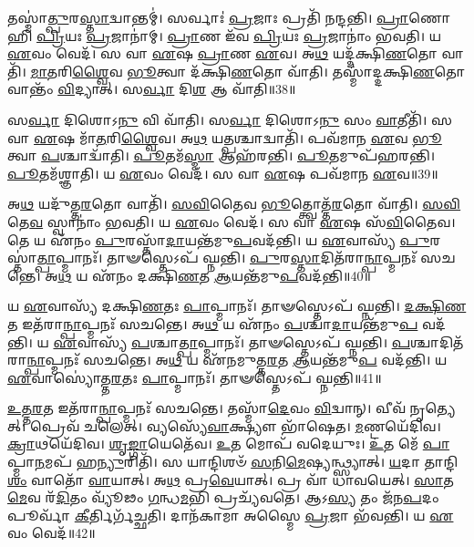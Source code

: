 𑌤𑌸𑍍𑌮𑌾॑\-\ul{𑌤𑍍𑌪𑍁}\-𑌰\-\ul{𑌸𑍍𑌤𑌾}\-𑌦𑍍𑌵𑌾𑌨𑍍𑌤𑌮𑍍॑।
𑌸𑌰𑍍𑌵𑌾𑌃॑ \ul{𑌪𑍍𑌰}\-𑌜𑌾𑌃 𑌪𑍍𑌰𑌤𑌿᳴ 𑌨𑌨𑍍𑌦𑌨𑍍𑌤𑌿।
\-\ul{𑌪𑍍𑌰𑌾}\-𑌣𑍋 𑌹𑌿 \ul{𑌪𑍍𑌰𑌿}\-𑌯𑌃 \ul{𑌪𑍍𑌰}\-𑌜𑌾𑌨𑌾॑𑌮𑍍।
\-\ul{𑌪𑍍𑌰𑌾}\-𑌣 𑌇᳴𑌵 \ul{𑌪𑍍𑌰𑌿}\-𑌯𑌃 \ul{𑌪𑍍𑌰}\-𑌜𑌾𑌨𑌾𑌂॑ 𑌭𑌵𑌤𑌿।
𑌯 \ul{𑌏}\-𑌵𑌂 𑌵𑍇𑌦᳴।
𑌸 𑌵𑌾 \ul{𑌏}\-𑌷 \ul{𑌪𑍍𑌰𑌾}\-𑌣 \ul{𑌏}\-𑌵।
𑌅\-\ul{𑌥} 𑌯𑌦𑍍𑌦᳴𑌕𑍍𑌷𑌿\-\ul{𑌣}\-𑌤𑍋 𑌵𑌾𑌤𑌿᳴।
\-\ul{𑌮𑌾}\-\-\ul{𑌤}\-𑌰𑌿\-\ul{𑌶𑍍𑌵𑍈}\-𑌵 \ul{𑌭𑍂}\-𑌤𑍍𑌵𑌾 𑌦᳴𑌕𑍍𑌷𑌿\-\ul{𑌣}\-𑌤𑍋 𑌵𑌾᳴𑌤𑌿।
𑌤𑌸𑍍𑌮𑌾॑𑌦𑍍𑌦𑌕𑍍𑌷𑌿\-\ul{𑌣}\-𑌤𑍋 𑌵𑌾𑌨𑍍𑌤𑌂᳴ \ul{𑌵𑌿}\-𑌦𑍍𑌯𑌾𑌤𑍍।
𑌸\-\ul{𑌰𑍍𑌵𑌾} 𑌦𑌿\-\ul{𑌶} 𑌆 𑌵𑌾᳴𑌤𑌿॥38॥

𑌸\-\ul{𑌰𑍍𑌵𑌾} 𑌦𑌿𑌶𑍋𑌽\-\ul{𑌨𑍁} 𑌵𑌿 𑌵𑌾᳴𑌤𑌿।
𑌸\-\ul{𑌰𑍍𑌵𑌾} 𑌦𑌿𑌶𑍋𑌽\-\ul{𑌨𑍁} 𑌸𑌂 \ul{𑌵𑌾}\-𑌤𑍀𑌤𑌿᳴।
𑌸 𑌵𑌾 \ul{𑌏}\-𑌷 𑌮𑌾᳴\-\ul{𑌤}\-𑌰𑌿\-\ul{𑌶𑍍𑌵𑍈}\-𑌵।
𑌅\-\ul{𑌥} 𑌯\-\ul{𑌤𑍍𑌪}\-𑌶𑍍𑌚𑌾𑌦𑍍𑌵𑌾𑌤𑌿᳴।
𑌪𑌵᳴𑌮𑌾𑌨 \ul{𑌏}\-𑌵 \ul{𑌭𑍂}\-𑌤𑍍𑌵𑌾 \ul{𑌪}\-𑌶𑍍𑌚𑌾𑌦𑍍𑌵𑌾᳴𑌤𑌿।
\-\ul{𑌪𑍂}\-𑌤𑌮᳴\-\ul{𑌸𑍍𑌮𑌾} 𑌆𑌹᳴𑌰𑌨𑍍𑌤𑌿।
\-\ul{𑌪𑍂}\-𑌤𑌮𑍁𑌪᳴𑌹𑌰𑌨𑍍𑌤𑌿।
\-\ul{𑌪𑍂}\-𑌤𑌮᳴𑌶𑍍𑌞𑌾𑌤𑌿।
𑌯 \ul{𑌏}\-𑌵𑌂 𑌵𑍇𑌦᳴।
𑌸 𑌵𑌾 \ul{𑌏}\-𑌷 𑌪𑌵᳴𑌮𑌾𑌨 \ul{𑌏}\-𑌵॥39॥

𑌅\-\ul{𑌥} 𑌯𑌦𑍁᳴𑌤𑍍𑌤\-\ul{𑌰}\-𑌤𑍋 𑌵𑌾𑌤𑌿᳴।
\-\ul{𑌸}\-\-\ul{𑌵𑌿}\-𑌤𑍈𑌵 \ul{𑌭𑍂}\-𑌤𑍍𑌤𑍍𑌵𑍋𑌤𑍍𑌤᳴\-\ul{𑌰}\-𑌤𑍋 𑌵𑌾᳴𑌤𑌿।
\-\ul{𑌸}\-\-\ul{𑌵𑌿}\-𑌤𑍇\-\ul{𑌵} 𑌸𑍍𑌵𑌾𑌨𑌾𑌂॑ 𑌭𑌵𑌤𑌿।
𑌯 \ul{𑌏}\-𑌵𑌂 𑌵𑍇𑌦᳴।
𑌸 𑌵𑌾 \ul{𑌏}\-𑌷 𑌸᳴\-\ul{𑌵𑌿}\-𑌤𑍈𑌵।
𑌤𑍇 𑌯 𑌏᳴𑌨𑌂 \ul{𑌪𑍁}\-𑌰𑌸𑍍𑌤𑌾᳴\-\ul{𑌦𑌾}\-𑌯𑌨𑍍𑌤᳴𑌮𑍁\-\ul{𑌪}\-𑌵𑌦᳴𑌨𑍍𑌤𑌿।
𑌯 \ul{𑌏}\-𑌵𑌾𑌸𑍍𑌯᳴ \ul{𑌪𑍁}\-𑌰𑌸𑍍𑌤𑌾॑\-\ul{𑌤𑍍𑌪𑌾}\-𑌪𑍍𑌮𑌾𑌨𑌃᳴।
𑌤𑌾𑍟𑌸𑍍𑌤𑍇𑌽𑌪᳴ 𑌘𑍍𑌨𑌨𑍍𑌤𑌿।
\-\ul{𑌪𑍁}\-𑌰\-\ul{𑌸𑍍𑌤𑌾}\-𑌦𑌿𑌤᳴𑌰𑌾\-\ul{𑌨𑍍𑌪𑌾}\-𑌪𑍍𑌮𑌨𑌃᳴ 𑌸𑌚𑌨𑍍𑌤𑍇।
𑌅\-\ul{𑌥} 𑌯 𑌏᳴𑌨𑌂 𑌦𑌕𑍍𑌷𑌿\-\ul{𑌣}\-𑌤 \ul{𑌆}\-𑌯𑌨𑍍𑌤᳴𑌮𑍁\-\ul{𑌪}\-𑌵𑌦᳴𑌨𑍍𑌤𑌿॥40॥

𑌯 \ul{𑌏}\-𑌵𑌾𑌸𑍍𑌯᳴ 𑌦𑌕𑍍𑌷𑌿\-\ul{𑌣}\-𑌤𑌃 \ul{𑌪𑌾}\-𑌪𑍍𑌮𑌾𑌨𑌃᳴।
𑌤𑌾𑍟𑌸𑍍𑌤𑍇𑌽𑌪᳴ 𑌘𑍍𑌨𑌨𑍍𑌤𑌿।
\-\ul{𑌦}\-\-\ul{𑌕𑍍𑌷𑌿}\-\-\ul{𑌣}\-𑌤 𑌇𑌤᳴𑌰𑌾\-\ul{𑌨𑍍𑌪𑌾}\-𑌪𑍍𑌮𑌨𑌃᳴ 𑌸𑌚𑌨𑍍𑌤𑍇।
𑌅\-\ul{𑌥} 𑌯 𑌏᳴𑌨𑌂 \ul{𑌪}\-𑌶𑍍𑌚𑌾\-\ul{𑌦𑌾}\-𑌯𑌨𑍍𑌤᳴𑌮𑍁\-\ul{𑌪} 𑌵𑌦᳴𑌨𑍍𑌤𑌿।
𑌯 \ul{𑌏}\-𑌵𑌾𑌸𑍍𑌯᳴ \ul{𑌪}\-𑌶𑍍𑌚𑌾\-\ul{𑌤𑍍𑌪𑌾}\-𑌪𑍍𑌮𑌾𑌨𑌃᳴।
𑌤𑌾𑍟𑌸𑍍𑌤𑍇𑌽𑌪᳴ 𑌘𑍍𑌨𑌨𑍍𑌤𑌿।
\-\ul{𑌪}\-𑌶𑍍𑌚𑌾𑌦𑌿𑌤᳴𑌰𑌾\-\ul{𑌨𑍍𑌪𑌾}\-𑌪𑍍𑌮𑌨𑌃᳴ 𑌸𑌚𑌨𑍍𑌤𑍇।
𑌅\-\ul{𑌥} 𑌯 𑌏᳴𑌨𑌮𑍁𑌤𑍍𑌤\-\ul{𑌰}\-𑌤 \ul{𑌆}\-𑌯𑌨𑍍𑌤᳴𑌮𑍁\-\ul{𑌪} 𑌵𑌦᳴𑌨𑍍𑌤𑌿।
𑌯 \ul{𑌏}\-𑌵𑌾𑌸𑍍𑌯𑍋॑𑌤𑍍𑌤\-\ul{𑌰}\-𑌤𑌃 \ul{𑌪𑌾}\-𑌪𑍍𑌮𑌾𑌨𑌃᳴।
𑌤𑌾𑍟𑌸𑍍𑌤𑍇𑌽𑌪᳴ 𑌘𑍍𑌨𑌨𑍍𑌤𑌿॥41॥

\-\ul{𑌉}\-\-\ul{𑌤𑍍𑌤}\-\-\ul{𑌰}\-𑌤 𑌇𑌤᳴𑌰𑌾\-\ul{𑌨𑍍𑌪𑌾}\-𑌪𑍍𑌮𑌨𑌃᳴ 𑌸𑌚𑌨𑍍𑌤𑍇।
𑌤𑌸𑍍𑌮𑌾᳴\-\ul{𑌦𑍇}\-𑌵𑌂 \ul{𑌵𑌿}\-𑌦𑍍𑌵𑌾𑌨𑍍।
𑌵𑍀𑌵᳴ 𑌨𑍃𑌤𑍍𑌯𑍇𑌤𑍍।
𑌪𑍍𑌰𑍇𑌵᳴ 𑌚𑌲𑍇𑌤𑍍।
𑌵𑍍𑌯𑌸𑍍𑌯𑍇᳴\-\ul{𑌵𑌾}\-𑌕𑍍𑌷𑍍𑌯𑍗 𑌭𑌾᳴𑌷𑍇𑌤।
\-\ul{𑌮}\-𑌣𑍍𑌟𑌯𑍇᳴𑌦𑌿𑌵।
\-\ul{𑌕𑍍𑌰𑌾}\-𑌥𑌯𑍇᳴𑌦𑌿𑌵।
\-\ul{𑌶𑍃}\-\-\ul{𑌙𑍍𑌗𑌾}\-𑌯𑍇𑌤𑍇᳴𑌵।
\-\ul{𑌉}\-𑌤 𑌮𑍋𑌪᳴ 𑌵𑌦𑍇𑌯𑍁𑌃।
\-\ul{𑌉}\-𑌤 𑌮𑍇᳴ \ul{𑌪𑌾}\-𑌪𑍍𑌮𑌾\-\ul{𑌨}\-𑌮𑌪᳴ 𑌹\-\ul{𑌨𑍍𑌯𑍁}\-𑌰𑌿𑌤𑌿᳴।
𑌸 𑌯𑌾𑌨𑍍𑌦𑌿𑌶𑍞᳴ \ul{𑌸}\-𑌨𑌿\-\ul{𑌮𑍇}\-𑌷𑍍𑌯𑌨𑍍𑌥𑍍𑌸𑍍𑌯𑌾𑌤𑍍।
\-\ul{𑌯}\-𑌦𑌾 𑌤𑌾𑌨𑍍𑌦𑌿\-\ul{𑌶𑌂} 𑌵𑌾𑌤𑍋᳴ \ul{𑌵𑌾}\-𑌯𑌾𑌤𑍍।
𑌅\-\ul{𑌥} 𑌪𑍍𑌰\-\ul{𑌵𑍇}\-𑌯𑌾𑌤𑍍।
𑌪𑍍𑌰 𑌵𑌾᳴ 𑌧𑌾𑌵𑌯𑍇𑌤𑍍।
\-\ul{𑌸𑌾}\-𑌤\-\ul{𑌮𑍇}\-𑌵 𑌰᳴\-\ul{𑌦𑌿}\-𑌤𑌂 𑌵𑍍𑌯𑍂᳴𑌢𑌂 \ul{𑌗}\-𑌨𑍍𑌧\-\ul{𑌮}\-𑌭𑌿 𑌪𑍍𑌰𑌚𑍍𑌯᳴𑌵𑌤𑍇।
𑌆𑌽\-\ul{𑌸𑍍𑌯} 𑌤𑌂 𑌜᳴𑌨\-\ul{𑌪}\-𑌦𑌂 𑌪𑍂𑌰𑍍𑌵𑌾᳴ \ul{𑌕𑍀}\-𑌰𑍍𑌤𑌿𑌰𑍍𑌗᳴𑌚𑍍𑌛𑌤𑌿।
𑌦𑌾𑌨᳴𑌕𑌾𑌮𑌾 𑌅𑌸𑍍𑌮𑍈 \ul{𑌪𑍍𑌰}\-𑌜𑌾 𑌭᳴𑌵𑌨𑍍𑌤𑌿।
𑌯 \ul{𑌏}\-𑌵𑌂 𑌵𑍇𑌦᳴॥42॥\anuvakamend[𑌵𑍇\-\ul{𑌦} 𑌸𑌮𑍍𑌪᳴𑌵𑌤 𑌆\-\ul{𑌦𑌿}\-𑌤𑍍𑌯𑌾𑌤𑍍𑌪᳴𑌵𑌤𑍇 \ul{𑌵𑌾}\-𑌤𑍍𑌯𑌾 𑌵𑌾॑\-\ul{𑌤𑍍𑌯𑍇}\-𑌷 𑌪𑌵᳴𑌮𑌾𑌨 \ul{𑌏}\-𑌵 𑌦᳴𑌕𑍍𑌷𑌿\-\ul{𑌣}\-𑌤 \ul{𑌆}\-𑌯𑌨𑍍𑌤᳴𑌮𑍁\-\ul{𑌪} 𑌵𑌦᳴𑌨𑍍𑌤𑍍𑌯𑍁𑌤𑍍𑌤\-\ul{𑌰}\-𑌤𑌃 \ul{𑌪𑌾}\-𑌪𑍍𑌮𑌾\-\ul{𑌨}\-𑌸𑍍𑌤𑌾𑍟 𑌸𑍍𑌤𑍇𑌪᳴ \ul{𑌘𑍍𑌨}\-𑌨𑍍𑌤𑍀\-\ul{𑌤𑍍𑌯}\-𑌷𑍍𑌟𑍗 𑌚᳴]


